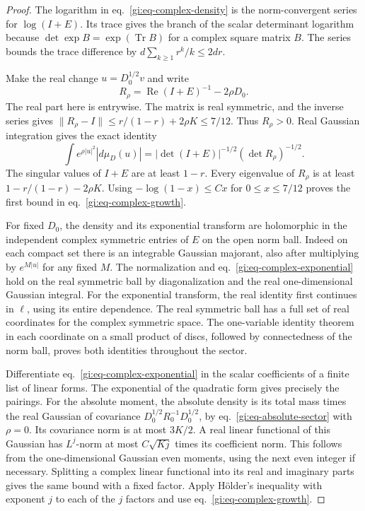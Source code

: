 \documentclass[11pt,letterpaper,reqno]{amsart}
\numberwithin{equation}{section}
\renewcommand{\eqref}[1]{\textup{eq.~\ref{#1}}}
\theoremstyle{definition}
\theoremstyle{remark}
\begin{document}
\begin{proof}
The logarithm in \eqref{gi:eq-complex-density} is the norm-convergent
series for \(\log(I+E)\). Its trace gives the branch of the scalar
determinant logarithm because \(\det\exp B=\exp(\operatorname{Tr}B)\)
for a complex square matrix \(B\). The series bounds the trace
difference by \(d\sum_{k\ge1}r^k/k\le2dr\).

Make the real change \(u=D_0^{1/2}v\) and write
\[
 R_\rho=\operatorname{Re}(I+E)^{-1}-2\rho D_0.
\]
The real part here is entrywise. The matrix is real symmetric, and the
inverse series gives
\(\|R_\rho-I\|\le r/(1-r)+2\rho K\le 7/12\).
Thus \(R_\rho>0\). Real Gaussian integration gives the exact identity
\begin{equation}\label{gi:eq-absolute-sector}
 \int e^{\rho |u|^2}|d\mu_D(u)|
           =|\det(I+E)|^{-1/2}(\det R_\rho)^{-1/2}.
\end{equation}
The singular values of \(I+E\) are at least \(1-r\).
Every eigenvalue of \(R_\rho\) is at least \(1-r/(1-r)-2\rho K\).
Using \(-\log(1-x)\le Cx\) for \(0\le x\le 7/12\) proves the first
bound in \eqref{gi:eq-complex-growth}.

For fixed \(D_0\), the density and its exponential transform are
holomorphic in the independent complex symmetric entries of \(E\)
on the open norm ball. Indeed on each compact set there is an
integrable Gaussian majorant, also after multiplying by
\(e^{M|u|}\) for any fixed \(M\). The normalization and
\eqref{gi:eq-complex-exponential} hold on the real symmetric ball by
diagonalization and the real one-dimensional Gaussian integral.
For the exponential transform, the real identity first continues
in \(\ell\), using its entire dependence. The real symmetric ball
has a full set of real coordinates for the complex symmetric
space. The one-variable identity theorem in each coordinate on
a small product of discs, followed by connectedness of the norm
ball, proves both identities throughout the sector.

Differentiate \eqref{gi:eq-complex-exponential} in the scalar
coefficients of a finite list of linear forms. The exponential of
the quadratic form gives precisely the pairings. For the absolute
moment, the absolute density is its total mass times the real
Gaussian of covariance \(D_0^{1/2}R_0^{-1}D_0^{1/2}\), by
\eqref{gi:eq-absolute-sector} with \(\rho=0\). Its covariance norm
is at most \(3K/2\). A real linear functional of this Gaussian has
\(L^j\)-norm at most \(C\sqrt{Kj}\) times its coefficient norm.
This follows from the one-dimensional Gaussian even moments,
using the next even integer if necessary. Splitting a complex
linear functional into its real and imaginary parts gives the
same bound with a fixed factor. Apply H\"older's inequality with
exponent \(j\) to each of the \(j\) factors and use
\eqref{gi:eq-complex-growth}.
\end{proof}
\end{document}
